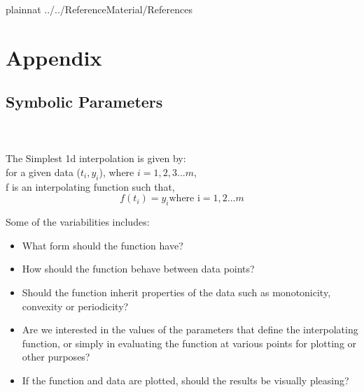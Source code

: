 \documentclass[12pt]{article}
\begin{document}

\newpage

 {plainnat}
 {../../ReferenceMaterial/References}

\newpage

\section{Appendix}


\subsection{Symbolic Parameters}




\\
\ms{***********************************************************************}
\\
The Simplest 1d interpolation is given by:\\
for a given data ($t_{i},y_{i}$), where $i = 1,2,3...m$,\\
f is an interpolating function such that, \\
\begin{equation*}
f(t_{i}) = y_i \text{where i} = 1,2...m
\end{equation*}

Some of the variabilities includes:\\
\begin{itemize}
	\item What form should the function have?
	\item How should the function behave between data points?
	\item Should the function inherit properties of the data such as monotonicity, convexity or periodicity?
	\item Are we interested in the values of the parameters that define the interpolating function, or simply in evaluating the function at various points for plotting or other purposes?
	\item If the function and data are plotted, should the results be visually pleasing?  
\end{itemize}
\end{document}
